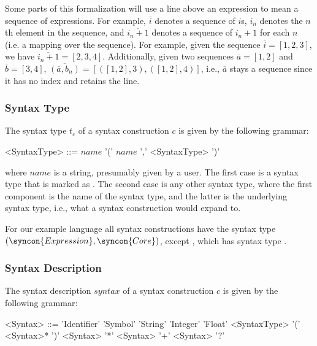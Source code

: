 \documentclass{kththesis}
\begin{document}
Some parts of this formalization will use a line above an expression to mean a sequence of expressions. For example, $\overline{i}$ denotes a sequence of $i$s, $i_n$ denotes the $n$th element in the sequence, and $\overline{i_n + 1}$ denotes a sequence of $i_n + 1$ for each $n$ (i.e. a mapping over the sequence). For example, given the sequence $\overline{i} = [1, 2, 3]$, we have $\overline{i_n + 1} = [2, 3, 4]$. Additionally, given two sequences $\overline{a} = [1, 2]$ and $\overline{b} = [3, 4]$, $\overline{(\overline{a}, b_n)} = [([1, 2], 3), ([1, 2], 4)]$, i.e., $\overline{a}$ stays a sequence since it has no index and retains the line.

\subsubsection{Syntax Type}

The syntax type $t_c$ of a syntax construction $c$ is given by the following grammar:

\setlength{\grammarindent}{8em}
\begin{grammar}
<SyntaxType> ::= $\mathit{name}$
  \alt '(' $\mathit{name}$ ',' <SyntaxType> ')'
\end{grammar}

where $\mathit{name}$ is a string, presumably given by a user. The first case is a syntax type that is marked as . The second case is any other syntax type, where the first component is the name of the syntax type, and the latter is the underlying syntax type, i.e., what a syntax construction would expand to.

For our example language all syntax constructions have the syntax type $(\syncon{Expression}, \syncon{Core})$, except , which has syntax type .

\subsubsection{Syntax Description}

The syntax description $\mathit{syntax}$ of a syntax construction $c$ is given by the following grammar:

\setlength{\grammarindent}{6em}
\begin{grammar}
<Syntax> ::= 'Identifier'
  \alt 'Symbol'
  \alt 'String'
  \alt 'Integer'
  \alt 'Float'
  \alt <SyntaxType>
  \alt '(' <Syntax>* ')'
  \alt <Syntax> '*'
  \alt <Syntax> '+'
  \alt <Syntax> '?'
\end{grammar}
\end{document}
